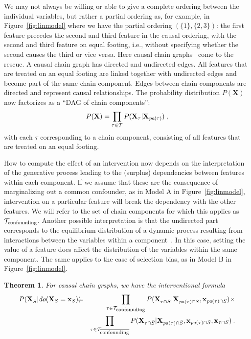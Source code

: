 \documentclass{article}
\newcommand{\vX}{\mathbf{X}}
\newcommand{\vx}{\mathbf{x}}
\newcommand{\dodo}{\mathit{do}}
\newcommand{\lvdo}[1]{\dodo(\vX_{#1} = \vx_{#1})}
\newcommand{\spa}{\mathop{\textit{\scriptsize pa}}}
\newcommand{\onder}[2]{{#1}_{\mbox{\scriptsize #2}}}
\newcommand{\isequal}{\hspace*{-2.5mm} & = & \hspace*{-2.5mm}}
\newcommand{\chaincomponents}{{\cal T}}
\newtheorem{theorem}{Theorem}
\begin{document}
We may not always be willing or able to give a complete ordering between the individual variables, but rather a partial ordering as, for example, in Figure~\ref{fig:linmodel} where we have the partial ordering $(\{1\},\{2,3\})$: the first feature precedes the second and third feature in the causal ordering, with the second and third feature on equal footing, i.e., without specifying whether the second causes the third or vice versa. Here causal chain graphs~\cite{lauritzen2002chain} come to the rescue. A causal chain graph has directed and undirected edges. All features that are treated on an equal footing are linked together with undirected edges and become part of the same chain component. Edges between chain components are directed and represent causal relationships. The probability distribution $P(\vX)$ now factorizes as a ``DAG of chain components'':
\[
P(\vX) = \prod_{\tau \in \chaincomponents} P(\vX_\tau|\vX_{\spa(\tau)}) \: ,
\]
with each $\tau$ corresponding to a chain component, consisting of all features that are treated on an equal footing.

How to compute the effect of an intervention now depends on the interpretation of the generative process leading to the (surplus) dependencies between features within each component. If we assume that these are the consequence of marginalizing out a common confounder, as in Model A in Figure~\ref{fig:linmodel}, intervention on a particular feature will break the dependency with the other features. We will refer to the set of chain components for which this applies as $\onder{\chaincomponents}{confounding}$. Another possible interpretation is that the undirected part corresponds to the equilibrium distribution of a dynamic process resulting from interactions between the variables within a component~\cite{lauritzen2002chain}. In this case, setting the value of a feature does affect the distribution of the variables within the same component. The same applies to the case of selection bias, as in Model B in Figure~\ref{fig:linmodel}.

\begin{theorem}
For causal chain graphs, we have the interventional formula
\begin{eqnarray*}
P(\vX_{\bar{S}}|\lvdo{S}) \isequal \prod_{\tau \in \chaincomponents_{\textrm{\upshape \scriptsize confounding}}} P(\vX_{\tau \cap \bar{S}}|\vX_{\spa(\tau)  \cap \bar{S}},\vx_{\spa(\tau) \cap S}) \times \\
&& \prod_{\tau \in \chaincomponents_{\overline{\textrm{\upshape \scriptsize confounding}}}} P(\vX_{\tau \cap \bar{S}}|\vX_{\spa(\tau)  \cap \bar{S}},\vx_{\spa(\tau) \cap S},\vx_{\tau \cap S}) \: .
\end{eqnarray*}
\end{theorem}
\end{document}

